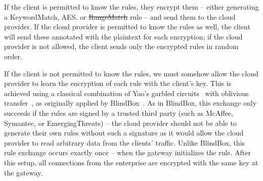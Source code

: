 \documentclass[letterpaper,twocolumn,10pt]{article}
\newcommand{\sys}{Embark\xspace} %
\providecommand{\DIFaddtex}[1]{{\protect\color{blue}\uwave{#1}}} %
\providecommand{\DIFdeltex}[1]{{\protect\color{red}\sout{#1}}}                      %
\providecommand{\DIFaddbegin}{} %
\providecommand{\DIFaddend}{} %
\providecommand{\DIFdelbegin}{} %
\providecommand{\DIFdelend}{} %
\providecommand{\DIFadd}[1]{\texorpdfstring{\DIFaddtex{#1}}{#1}} %
\providecommand{\DIFdel}[1]{\texorpdfstring{\DIFdeltex{#1}}{}} %
\begin{document}
If the client is permitted to know the rules, they encrypt them -- either generating a KeywordMatch, AES, or \DIFdelbegin \DIFdel{RangeMatch }\DIFdelend \DIFaddbegin \DIFadd{PrefixMatch }\DIFaddend rule -- and send them to the cloud provider. If the cloud provider is permitted to know the rules as well, the client will send these annotated with the plaintext for each encryption; if the cloud provider is not allowed, the client sends only the encrypted rules in random order.

If the client is not permitted to know the rules, we must somehow allow the cloud provider to learn the encryption of each rule with the client's key. This is achieved using a classical combination of Yao's garbled circuits~\cite{Yao86} with oblivious transfer~\cite{Naor-Pinkas}, as originally applied by BlindBox~\cite{blindbox}.
As in BlindBox, this exchange only succeeds if the rules are signed by a trusted third party (such as McAffee, Symantec, or EmergingThreats) -- the cloud provider should not be able to generate their own rules without such a signature as it would allow the cloud provider to read arbitrary data from the clients' traffic.
Unlike BlindBox, this rule exchange occurs exactly once -- when the gateway initializes the rule. 
After this setup, all connections from the enterprise are encrypted with the same key at the gateway.
\end{document}
